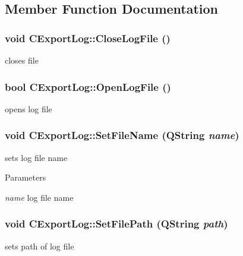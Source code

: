 \subsection{Member Function Documentation}
\hypertarget{classCExportLog_a693e8f83ac60f696f88358e8c907f316}{
\subsubsection[{CloseLogFile}]{\setlength{\rightskip}{0pt plus 5cm}void CExportLog::CloseLogFile ()}}
\label{classCExportLog_a693e8f83ac60f696f88358e8c907f316}
closes file \hypertarget{classCExportLog_ac5b1e09dd67f6aaa199f6ff98c0e1138}{
\subsubsection[{OpenLogFile}]{\setlength{\rightskip}{0pt plus 5cm}bool CExportLog::OpenLogFile ()}}
\label{classCExportLog_ac5b1e09dd67f6aaa199f6ff98c0e1138}
opens log file \hypertarget{classCExportLog_aeaa6ab60ed0b4cad6b465f309da5d6b2}{
\subsubsection[{SetFileName}]{\setlength{\rightskip}{0pt plus 5cm}void CExportLog::SetFileName (QString {\em name})}}
\label{classCExportLog_aeaa6ab60ed0b4cad6b465f309da5d6b2}
sets log file name


\begin{DoxyParams}{Parameters}
\item[{\em name}]log file name \end{DoxyParams}
\hypertarget{classCExportLog_a72fbcc722def244634996c0a4c7ae7dd}{
\subsubsection[{SetFilePath}]{\setlength{\rightskip}{0pt plus 5cm}void CExportLog::SetFilePath (QString {\em path})}}
\label{classCExportLog_a72fbcc722def244634996c0a4c7ae7dd}
sets path of log file


